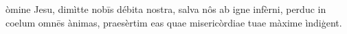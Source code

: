 òmine Jesu, dimìtte nobīs débita nostra, salva nôs ab igne infèrni, perduc in coelum omnēs ànimas, praesèrtim eas quae misericòrdiae tuae màxime ìndiģent.
